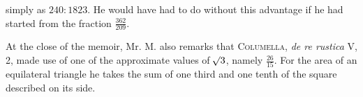 %
simply as \(240:1823\). He would have had to do without this advantage if he had started from the fraction \(\frac{362}{209}\).

At the close of the memoir, Mr. M. also remarks that \textsc{Columella}, \textit{de re rustica} V, 2, made use of one of the approximate values of \(\mathord{{}^{}\!\surd}3\), namely \(\frac{26}{15}\). For the area of an equilateral triangle he takes the sum of one third and one tenth of the square described on its side.

